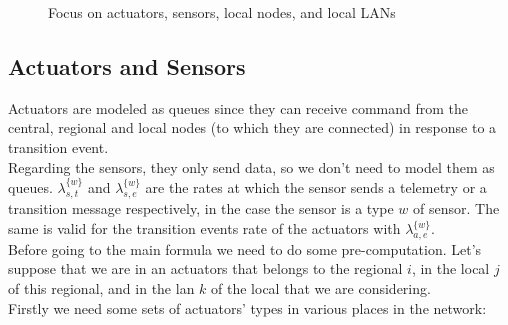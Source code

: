 \documentclass[11pt]{article}
\begin{document}
\begin{figure}[H]
	\centering
	\frame{}
	\caption{Focus on actuators, sensors,  local nodes, and local LANs}
\end{figure}

\subsection{Actuators and Sensors}
Actuators are modeled as queues since they can receive command from the central, regional and local nodes (to which they are connected) in response to a transition event.\\
Regarding the sensors, they only send data, so we don't need to model them as queues. $\lambda^{\{w\}}_{s,t}$ and $\lambda^{\{w\}}_{s,e}$ are the rates at which the sensor sends a telemetry or a transition message respectively, in the case the sensor is a type $w$ of sensor. The same is valid for the transition events rate of the actuators with $\lambda^{\{w\}}_{a,e}$.\\


Before going to the main formula we need to do some pre-computation.
Let's suppose that we are in an actuators that belongs to the regional $i$, in the local $j$ of this regional, and in the lan $k$ of the local that we are considering. \\
Firstly we need some sets of actuators' types in various places in the network:
\end{document}
